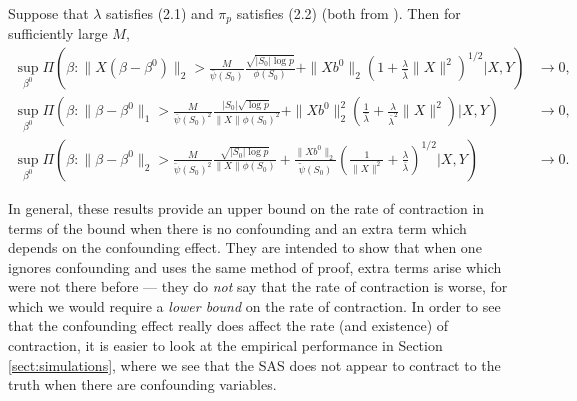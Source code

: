 \documentclass[11pt]{article}
\numberwithin{equation}{section}
\begin{document}
\begin{theorem}
	Suppose that $\lambda$ satisfies {\color{assumption} (2.1) and $\pi_p$ satisfies (2.2)} (both from \cite{CS-HV2015}). Then for sufficiently large $M$,
\begin{align*}
	\sup_{\beta^0} \Pi\left(\beta: \|X(\beta - \beta^0)\|_2 > \frac{M}{\bar{\psi}(S_0)} \frac{\sqrt{|S_0|\log p}}{\phi(S_0)}  + \|Xb^0\|_2\left(1 + \frac{\lambda}{\bar{\lambda}}\|X\|^2\right)^{1/2}| X, Y \right) &\rightarrow 0, \\
		\sup_{\beta^0} \Pi\left(\beta: \|\beta - \beta^0\|_1 > \frac{M}{\bar{\psi}(S_0)^2} \frac{|S_0|\sqrt{\log p}}{\|X\|\phi(S_0)^2}  + \|Xb^0\|_2^2\left(\frac{1}{\bar{\lambda}} + \frac{\lambda}{\bar{\lambda}^2}\|X\|^2\right) | X, Y \right) &\rightarrow 0, \\
		\sup_{\beta^0} \Pi\left(\beta: \|\beta - \beta^0\|_2 > \frac{M}{\tilde{\psi}(S_0)^2} \frac{\sqrt{|S_0|\log p}}{\|X\|\phi(S_0)}  + \frac{\|Xb^0\|_2}{\tilde{\psi}(S_0)}\left(\frac{1}{\|X\|^2} + \frac{\lambda}{\bar{\lambda}}\right)^{1/2} | X, Y \right) &\rightarrow 0.
\end{align*}
\end{theorem}
In general, these results provide an upper bound on the rate of contraction in terms of the bound when there is no confounding and an extra term which depends on the confounding effect. They are intended to show that when one ignores confounding and uses the same method of proof, extra terms arise which were not there before --- they do {\it not} say that the rate of contraction is worse, for which we would require a {\it lower bound} on the rate of contraction. In order to see that the confounding effect really does affect the rate (and existence) of contraction, it is easier to look at the empirical performance in Section \ref{sect:simulations}, where we see that the SAS does not appear to contract to the truth when there are confounding variables.
\end{document}
